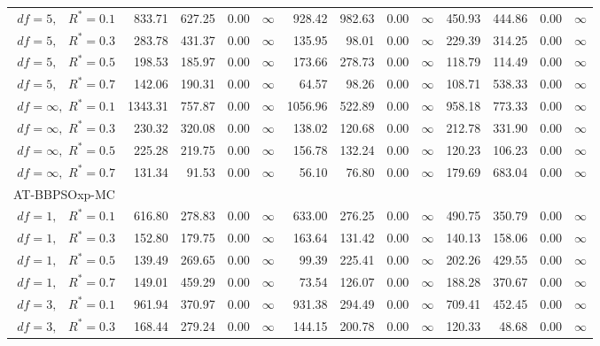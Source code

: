 \documentclass[12pt]{article}
\begin{document}
\begin{table}[ht]
{\begin{tabular}{r|rrrr|rrrr|rrrr}
  $df = 5,\enspace$ $R^* =0.1$ & 833.71 & 627.25 & 0.00 & $\infty$ & 928.42 & 982.63 & 0.00 & $\infty$ & 450.93 & 444.86 & 0.00 & $\infty$ \\ 
  $df = 5,\enspace$ $R^* =0.3$ & 283.78 & 431.37 & 0.00 & $\infty$ & 135.95 & 98.01 & 0.00 & $\infty$ & 229.39 & 314.25 & 0.00 & $\infty$ \\ 
  $df = 5,\enspace$ $R^* =0.5$ & 198.53 & 185.97 & 0.00 & $\infty$ & 173.66 & 278.73 & 0.00 & $\infty$ & 118.79 & 114.49 & 0.00 & $\infty$ \\ 
  $df = 5,\enspace$ $R^* =0.7$ & 142.06 & 190.31 & 0.00 & $\infty$ & 64.57 & 98.26 & 0.00 & $\infty$ & 108.71 & 538.33 & 0.00 & $\infty$ \\ 
  $df = \infty,$ $R^* =0.1$ & 1343.31 & 757.87 & 0.00 & $\infty$ & 1056.96 & 522.89 & 0.00 & $\infty$ & 958.18 & 773.33 & 0.00 & $\infty$ \\ 
  $df = \infty,$ $R^* =0.3$ & 230.32 & 320.08 & 0.00 & $\infty$ & 138.02 & 120.68 & 0.00 & $\infty$ & 212.78 & 331.90 & 0.00 & $\infty$ \\ 
  $df = \infty,$ $R^* =0.5$ & 225.28 & 219.75 & 0.00 & $\infty$ & 156.78 & 132.24 & 0.00 & $\infty$ & 120.23 & 106.23 & 0.00 & $\infty$ \\ 
  $df = \infty,$ $R^* =0.7$ & 131.34 & 91.53 & 0.00 & $\infty$ & 56.10 & 76.80 & 0.00 & $\infty$ & 179.69 & 683.04 & 0.00 & $\infty$ \\ 
\hline
\multicolumn{1}{l|}{AT-BBPSOxp-MC} &&&&&&&&&&&&\\
  $df = 1,\enspace$ $R^* =0.1$ & 616.80 & 278.83 & 0.00 & $\infty$ & 633.00 & 276.25 & 0.00 & $\infty$ & 490.75 & 350.79 & 0.00 & $\infty$ \\ 
  $df = 1,\enspace$ $R^* =0.3$ & 152.80 & 179.75 & 0.00 & $\infty$ & 163.64 & 131.42 & 0.00 & $\infty$ & 140.13 & 158.06 & 0.00 & $\infty$ \\ 
  $df = 1,\enspace$ $R^* =0.5$ & 139.49 & 269.65 & 0.00 & $\infty$ & 99.39 & 225.41 & 0.00 & $\infty$ & 202.26 & 429.55 & 0.00 & $\infty$ \\ 
  $df = 1,\enspace$ $R^* =0.7$ & 149.01 & 459.29 & 0.00 & $\infty$ & 73.54 & 126.07 & 0.00 & $\infty$ & 188.28 & 370.67 & 0.00 & $\infty$ \\ 
  $df = 3,\enspace$ $R^* =0.1$ & 961.94 & 370.97 & 0.00 & $\infty$ & 931.38 & 294.49 & 0.00 & $\infty$ & 709.41 & 452.45 & 0.00 & $\infty$ \\ 
  $df = 3,\enspace$ $R^* =0.3$ & 168.44 & 279.24 & 0.00 & $\infty$ & 144.15 & 200.78 & 0.00 & $\infty$ & 120.33 & 48.68 & 0.00 & $\infty$ \\ 

\end{tabular}}
\end{table}
\end{document}
